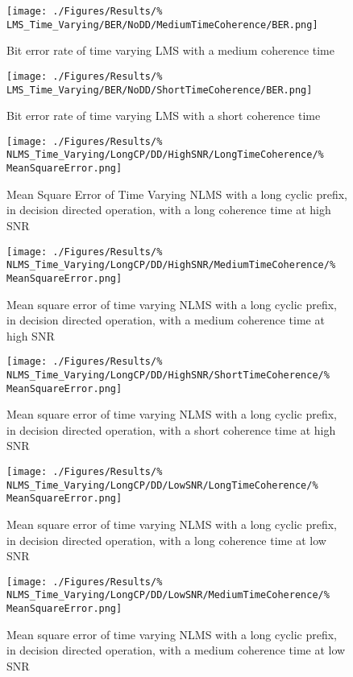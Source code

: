 \begin{figure}[ht]
	\texttt{[image: ./Figures/Results/\%
LMS\_Time\_Varying/BER/NoDD/MediumTimeCoherence/BER.png]}
	\caption{Bit error rate of time varying LMS with a medium coherence time}
\end{figure}
\begin{figure}[ht]
	\texttt{[image: ./Figures/Results/\%
LMS\_Time\_Varying/BER/NoDD/ShortTimeCoherence/BER.png]}
	\caption{Bit error rate of time varying LMS with a short coherence time}
\end{figure}
\FloatBarrier
\begin{figure}[ht]
	\texttt{[image: ./Figures/Results/\%
NLMS\_Time\_Varying/LongCP/DD/HighSNR/LongTimeCoherence/\%
MeanSquareError.png]}
	\caption{Mean Square Error of Time Varying NLMS with 
	a long cyclic prefix, in decision directed operation, with 
	a long coherence time at high SNR}
\end{figure}
\begin{figure}[ht]
	\texttt{[image: ./Figures/Results/\%
NLMS\_Time\_Varying/LongCP/DD/HighSNR/MediumTimeCoherence/\%
MeanSquareError.png]}
	\caption{Mean square error of time varying NLMS with a 
	long cyclic prefix, in decision directed operation, with a 
	medium coherence time at high SNR}
\end{figure}
\begin{figure}[ht]
	\texttt{[image: ./Figures/Results/\%
NLMS\_Time\_Varying/LongCP/DD/HighSNR/ShortTimeCoherence/\%
MeanSquareError.png]}
	\caption{Mean square error of time varying NLMS with a 
	long cyclic prefix, in decision directed operation, with a 
	short coherence time at high SNR}
	\label{fig:NLMS-Short-High-Directed-Long}
\end{figure}
\begin{figure}[ht]
	\texttt{[image: ./Figures/Results/\%
NLMS\_Time\_Varying/LongCP/DD/LowSNR/LongTimeCoherence/\%
MeanSquareError.png]}
	\caption{Mean square error of time varying NLMS with a 
	long cyclic prefix, in decision directed operation, with a 
	long coherence time at low SNR}
\end{figure}
\begin{figure}[ht]
	\texttt{[image: ./Figures/Results/\%
NLMS\_Time\_Varying/LongCP/DD/LowSNR/MediumTimeCoherence/\%
MeanSquareError.png]}
	\caption{Mean square error of time varying NLMS with a 
	long cyclic prefix, in decision directed operation, with a 
	medium coherence time at low SNR}
\end{figure}
